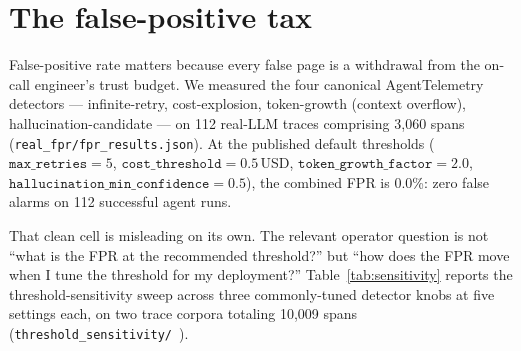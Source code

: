 \documentclass[journal]{IEEEtran}
\begin{document}
\section{The false-positive tax}

False-positive rate matters because every false page is a withdrawal from the on-call engineer's trust budget. We measured the four canonical AgentTelemetry detectors --- infinite-retry, cost-explosion, token-growth (context overflow), hallucination-candidate --- on 112 real-LLM traces comprising 3{,}060 spans (\texttt{real\_fpr/fpr\_results.json}). At the published default thresholds ($\texttt{max\_retries}{=}5$, $\texttt{cost\_threshold}{=}0.5$\,USD, $\texttt{token\_growth\_factor}{=}2.0$, $\texttt{hallucination\_min\_confidence}{=}0.5$), the combined FPR is 0.0\%: zero false alarms on 112 successful agent runs.

That clean cell is misleading on its own. The relevant operator question is not ``what is the FPR at the recommended threshold?'' but ``how does the FPR move when I tune the threshold for my deployment?'' Table~\ref{tab:sensitivity} reports the threshold-sensitivity sweep across three commonly-tuned detector knobs at five settings each, on two trace corpora totaling 10{,}009 spans (\texttt{threshold\_sensitivity/}~\cite{atrepo}).
\end{document}
